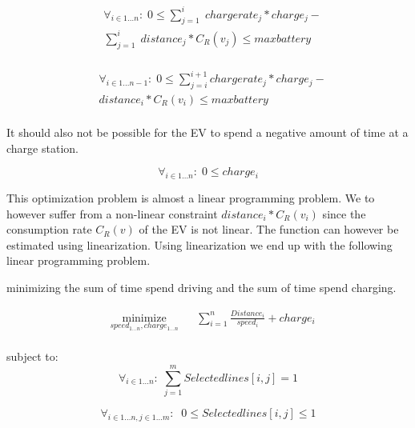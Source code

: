 \begin{equation}
\begin{aligned}
& \forall_{i \in 1 \dots n}: \; 0 \leq \sum_{j=1}^{i} \; chargerate_j*charge_j - \\
&  \sum_{j=1}^{i} \; distance_j*C_R(v_j) \leq maxbattery \\
 \end{aligned}
\end{equation}

\begin{equation}
\begin{aligned}
& \forall_{i \in 1 \dots n-1}: \; 0 \leq \sum_{j=i}^{i+1} chargerate_j*charge_j - \\
&   distance_i*C_R(v_i) \leq maxbattery \\
 \end{aligned}
\end{equation}

It should also not be possible for the EV to spend a negative amount of time at a charge station.

\begin{equation}
\forall_{i \in 1 \dots n}: \; 0 \leq charge_i 
\end{equation}

This optimization problem is almost a linear programming problem. We to however suffer from a non-linear constraint $distance_i*C_R(v_i)$ since the consumption rate $C_R(v)$ of the EV is not linear. The function can however be estimated using linearization. Using linearization we end up with the following linear programming problem.  
 
minimizing the sum of time spend driving and the sum of time spend charging. 

\begin{equation}
\begin{aligned}
 & \underset{speed_{1 \dots n},charge_{1 \dots n}}
{\text{minimize}}
& & \sum_{i=1}^{n} \frac{Distance_i}{speed_i} + charge_i \\
\end{aligned}
\end{equation}\label{eq:objfunction}

subject to: 
\begin{equation}
\forall_{i\in1 \dots n }:\; \sum_{j=1}^{m} Selectedlines[i,j] = 1
\end{equation}

\begin{equation}
\forall_{i\in1 \dots n, j \in 1 \dots m}: \; \;0\leq Selectedlines[i,j] \leq 1
\end{equation}

